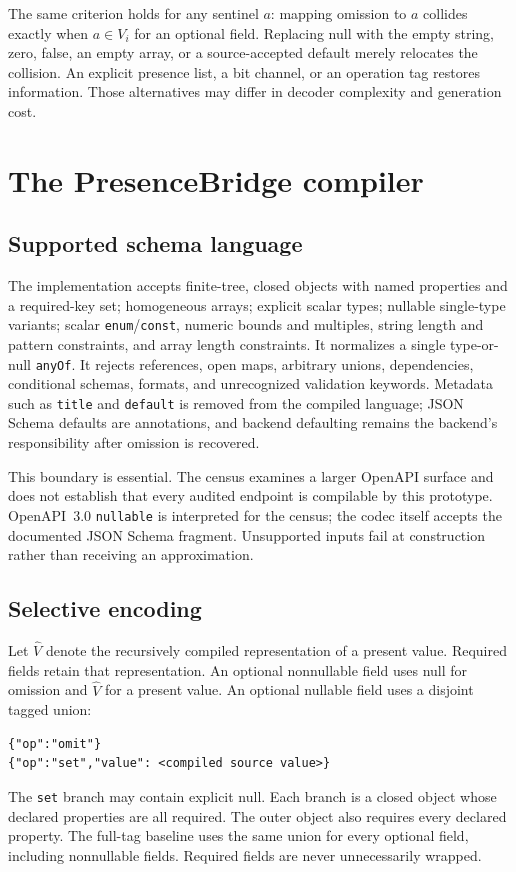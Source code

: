 \documentclass[10pt,twocolumn]{article}
\begin{document}
The same criterion holds for any sentinel $a$: mapping omission to $a$ collides exactly when $a\in V_i$ for an optional field. Replacing null with the empty string, zero, false, an empty array, or a source-accepted default merely relocates the collision. An explicit presence list, a bit channel, or an operation tag restores information. Those alternatives may differ in decoder complexity and generation cost.

\section{The PresenceBridge compiler}
\subsection{Supported schema language}
The implementation accepts finite-tree, closed objects with named properties and a required-key set; homogeneous arrays; explicit scalar types; nullable single-type variants; scalar \texttt{enum}/\texttt{const}, numeric bounds and multiples, string length and pattern constraints, and array length constraints. It normalizes a single type-or-null \texttt{anyOf}. It rejects references, open maps, arbitrary unions, dependencies, conditional schemas, formats, and unrecognized validation keywords. Metadata such as \texttt{title} and \texttt{default} is removed from the compiled language; JSON Schema defaults are annotations, and backend defaulting remains the backend's responsibility after omission is recovered.

This boundary is essential. The census examines a larger OpenAPI surface and does not establish that every audited endpoint is compilable by this prototype. OpenAPI~3.0 \texttt{nullable} is interpreted for the census; the codec itself accepts the documented JSON Schema fragment. Unsupported inputs fail at construction rather than receiving an approximation.

\subsection{Selective encoding}
Let $\widehat V$ denote the recursively compiled representation of a present value. Required fields retain that representation. An optional nonnullable field uses null for omission and $\widehat V$ for a present value. An optional nullable field uses a disjoint tagged union:
\begin{lstlisting}
{"op":"omit"}
{"op":"set","value": <compiled source value>}
\end{lstlisting}
The \texttt{set} branch may contain explicit null. Each branch is a closed object whose declared properties are all required. The outer object also requires every declared property. The full-tag baseline uses the same union for every optional field, including nonnullable fields. Required fields are never unnecessarily wrapped.
\end{document}
